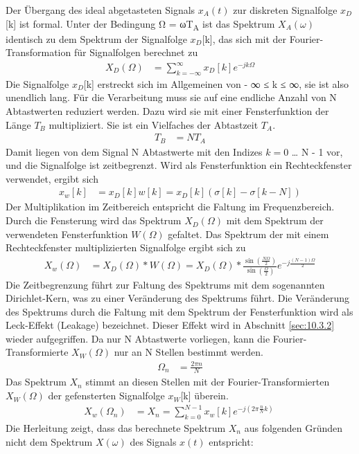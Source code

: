 Der Übergang des ideal abgetasteten Signals \(x_{A}(t)\) zur diskreten Signalfolge \(x_{D}\){[}k{]} ist formal. Unter der Bedingung Ω = ωT\textsubscript{A} ist das Spektrum \(X_{A}(ω)\) identisch zu dem Spektrum der Signalfolge \(x_{D}\){[}k{]}, das sich mit der Fourier-Transformation für Signalfolgen berechnet zu
\begin{align}
X_{D}(\Omega) &= \sum\limits_{k = - \infty}^{\infty}{x_{D}[ k]  e^{- j  k  \Omega}} \label{eq:10.52}
\end{align}
Die Signalfolge \(x_{D}\){[}k{]} erstreckt sich im Allgemeinen von - ∞ ≤ k ≤ ∞, sie ist also unendlich lang. Für die Verarbeitung muss sie auf eine endliche Anzahl von N Abtastwerten reduziert werden. Dazu wird sie mit einer Fensterfunktion der Länge \(T_{B}\) multipliziert. Sie ist ein Vielfaches der Abtastzeit \(T_{A}\).
\begin{align}
T_{B} &= N  T_{A} \label{eq:10.53}
\end{align}
Damit liegen von dem Signal N Abtastwerte mit den Indizes \(k = 0\) \ldots{} N - 1 vor, und die Signalfolge ist zeitbegrenzt. Wird als Fensterfunktion ein Rechteckfenster verwendet, ergibt sich
\begin{align}
x_{w}[ k] &= x_{D}[ k]  w[ k] = x_{D}[ k]  \left( \sigma[ k] - \sigma[ k - N] \right) \label{eq:10.54}
\end{align}
Der Multiplikation im Zeitbereich entspricht die Faltung im Frequenzbereich. Durch die Fensterung wird das Spektrum \(X_{D}(Ω)\) mit dem Spektrum der verwendeten Fensterfunktion \(W(Ω)\) gefaltet. Das Spektrum der mit einem Rechteckfenster multiplizierten Signalfolge ergibt sich zu
\begin{align}
X_{w}(\Omega) &= X_{D}(\Omega)*W(\Omega) = X_{D}(\Omega)*\frac{\sin\left( \frac{N  \Omega}{2} \right)}{\sin\left( \frac{\Omega}{2} \right)}  e^{- j  \frac{(N - 1)  \Omega}{2}} \label{eq:10.55}
\end{align}
Die Zeitbegrenzung führt zur Faltung des Spektrums mit dem sogenannten Dirichlet-Kern, was zu einer Veränderung des Spektrums führt. Die Veränderung des Spektrums durch die Faltung mit dem Spektrum der Fensterfunktion wird als Leck-Effekt (Leakage) bezeichnet. Dieser Effekt wird in Abschnitt \ref{sec:10.3.2} wieder aufgegriffen. Da nur N Abtastwerte vorliegen, kann die Fourier-Transformierte \(X_{W}(Ω)\) nur an N Stellen bestimmt werden.
\begin{align}
\Omega_{n} &= \frac{2  \pi  n}{N} \label{eq:10.56}
\end{align}
Das Spektrum \(X_{n}\) stimmt an diesen Stellen mit der Fourier-Transformierten \(X_{W}(Ω)\) der gefensterten Signalfolge \(x_{W}\){[}k{]} überein.
\begin{align}
X_{w}\left( \Omega_{n} \right) &= X_{n} = \sum\limits_{k = 0}^{N - 1}{x_{w}[ k]  e^{- j  \left( 2  \pi  \frac{n}{N}  k \right)}}\ \label{eq:10.57}
\end{align}
Die Herleitung zeigt, dass das berechnete Spektrum \(X_{n}\) aus folgenden Gründen nicht dem Spektrum \(X(ω)\) des Signals \(x(t)\) entspricht:

